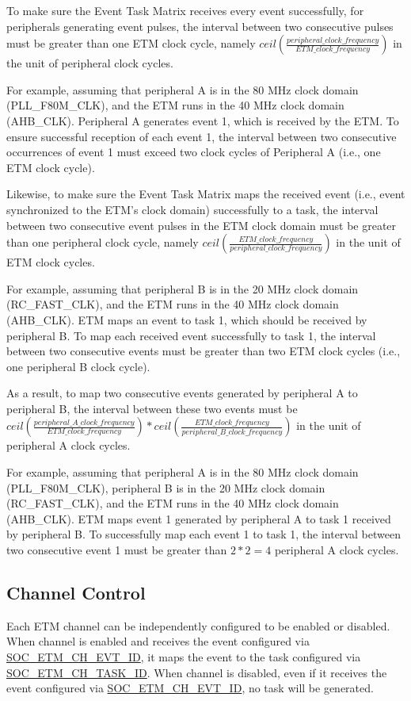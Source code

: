 \documentclass[main\_\_EN.tex]{subfiles}
\begin{document}
To make sure the Event Task Matrix receives every event successfully, for peripherals generating event pulses, the interval between two consecutive pulses must be greater than one ETM clock cycle, namely $ceil(\frac{peripheral\_clock\_frequency}{ETM\_clock\_frequency})$ in the unit of peripheral clock cycles.

For example, assuming that peripheral A is in the 80 MHz clock domain (PLL\_F80M\_CLK), and the ETM runs in the 40 MHz clock domain (AHB\_CLK). Peripheral A generates event 1, which is received by the ETM. To ensure successful reception of each event 1, the interval between two consecutive occurrences of event 1 must exceed two clock cycles of Peripheral A (i.e., one ETM clock cycle).

Likewise, to make sure the Event Task Matrix maps the received event (i.e., event synchronized to the ETM's clock domain) successfully to a task, the interval between two consecutive event pulses in the ETM clock domain must be greater than one peripheral clock cycle, namely $ceil(\frac{ETM\_clock\_frequency}{peripheral\_clock\_frequency})$ in the unit of ETM clock cycles.

For example, assuming that peripheral B is in the 20 MHz clock domain (RC\_FAST\_CLK), and the ETM runs in the 40 MHz clock domain (AHB\_CLK). ETM maps an event to task 1, which should be received by peripheral B. To map each received event successfully to task 1, the interval between two consecutive events must be greater than two ETM clock cycles (i.e., one peripheral B clock cycle).

As a result, to map two consecutive events generated by peripheral A to peripheral B, the interval between these two events must be $ceil(\frac{peripheral\_A\_clock\_frequency}{ETM\_clock\_frequency})*ceil(\frac{ETM\_clock\_frequency}{peripheral\_B\_clock\_frequency})$ in the unit of peripheral A clock cycles.

For example, assuming that peripheral A is in the 80 MHz clock domain (PLL\_F80M\_CLK), peripheral B is in the 20 MHz clock domain (RC\_FAST\_CLK), and the ETM runs in the 40 MHz clock domain (AHB\_CLK). ETM maps event 1 generated by peripheral A to task 1 received by peripheral B. To successfully map each event 1 to task 1, the interval between two consecutive event 1 must be greater than $2*2=4$ peripheral A clock cycles.


\subsection{Channel Control}
\label{sec:evntaskmatrix-channel-enable}
Each ETM channel can be independently configured to be enabled or disabled. When channel is enabled and receives the event configured via \hyperref[fielddesc:SOCETMCH0EVTID]{SOC\_ETM\_CH\_EVT\_ID}, it maps the event to the task configured via \hyperref[fielddesc:SOCETMCH0TASKID]{SOC\_ETM\_CH\_TASK\_ID}. When channel is disabled, even if it receives the event configured via \hyperref[fielddesc:SOCETMCH0EVTID]{SOC\_ETM\_CH\_EVT\_ID}, no task will be generated.
\end{document}
